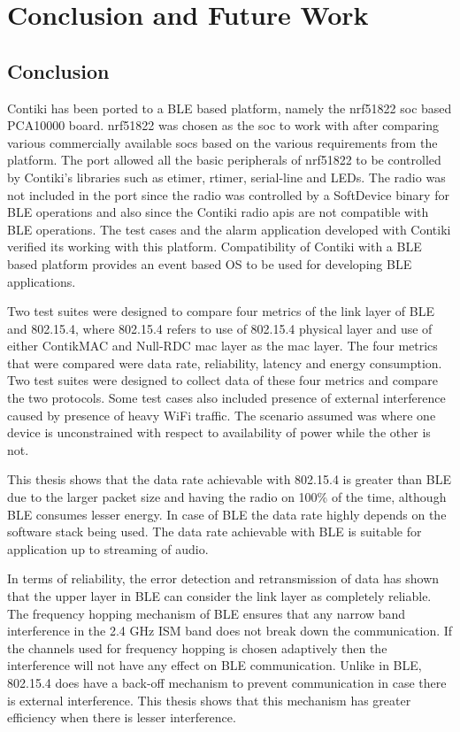 \chapter{Conclusion and Future Work} \label{9ConcFuture}
\section{Conclusion}

Contiki has been ported to a BLE based platform, namely the nrf51822 \gls{soc} based PCA10000 board. nrf51822 was chosen as the \gls{soc} to work with after comparing various commercially available \glspl{soc} based on the various requirements from the platform. The port allowed all the basic peripherals of nrf51822 to be controlled by Contiki's libraries such as etimer, rtimer, serial-line and LEDs.  The radio was not included in the port since the radio was controlled by a SoftDevice binary for BLE operations and also since the Contiki radio \glspl{api} are not compatible with BLE operations. The test cases and the alarm application developed with Contiki verified its working with this platform. Compatibility of Contiki with a BLE based platform provides an event based OS to be used for developing BLE applications.

Two test suites were designed to compare four metrics of the link layer of BLE and 802.15.4, where 802.15.4 refers to use of 802.15.4 physical layer and use of either ContikMAC and Null-RDC \gls{mac} layer as the \gls{mac} layer. The four metrics that were compared were data rate, reliability, latency and energy consumption. Two test suites were designed to collect data of these four metrics and compare the two protocols. Some test cases also included presence of external interference caused by presence of heavy WiFi traffic. The scenario assumed was where one device is unconstrained with respect to availability of power while the other is not.

This thesis shows that the data rate achievable with 802.15.4 is greater than BLE due to the larger packet size and having the radio on 100\% of the time, although BLE consumes lesser energy. In case of BLE the data rate highly depends on the software stack being used. The data rate achievable with BLE is suitable for application up to streaming of audio.  

In terms of reliability, the error detection and retransmission of data has shown that the upper layer in BLE can consider the link layer as completely reliable. The frequency hopping mechanism of BLE ensures that any narrow band interference in the 2.4 GHz ISM band does not break down the communication. If the channels used for frequency hopping is chosen adaptively then the interference will not have any effect on BLE communication. Unlike in BLE, 802.15.4 does have a back-off mechanism to prevent communication in case there is external interference. This thesis shows that this mechanism has greater efficiency when there is lesser interference. 

